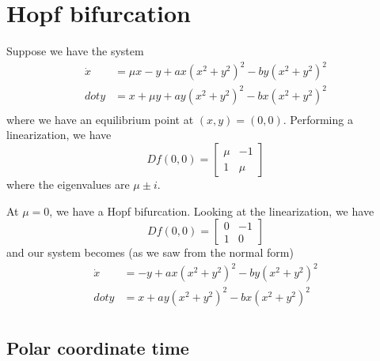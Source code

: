 \documentclass{article}
\begin{document}
\section{Hopf bifurcation}

Suppose we have the system
\begin{align*}
    \dot{x}&= \mu x - y + ax\left(x^2 + y^2\right)^2 - by\left(x^2 + y^2\right)^2 \\
    dot{y}&= x + \mu y + ay\left(x^2 + y^2\right)^2 - bx\left(x^2 + y^2\right)^2 \\
\end{align*}
where we have an equilibrium point at $(x,y)=(0,0)$. Performing a linearization, we have 
\[
Df(0,0)=\begin{bmatrix}
    \mu & -1 \\ 1 & \mu
\end{bmatrix}
\]
where the eigenvalues are $\mu \pm i$. 

At $\mu=0$, we have a Hopf bifurcation. Looking at the linearization, we have 
\[
Df(0,0)=\begin{bmatrix}
    0 & -1 \\ 1 & 0
\end{bmatrix}
\]
and our system becomes (as we saw from the normal form)
\begin{align*}
    \dot{x}&= - y + ax\left(x^2 + y^2\right)^2 - by\left(x^2 + y^2\right)^2 \\
    dot{y}&= x  + ay\left(x^2 + y^2\right)^2 - bx\left(x^2 + y^2\right)^2 \\
\end{align*}

\subsection{Polar coordinate time}
\end{document}
